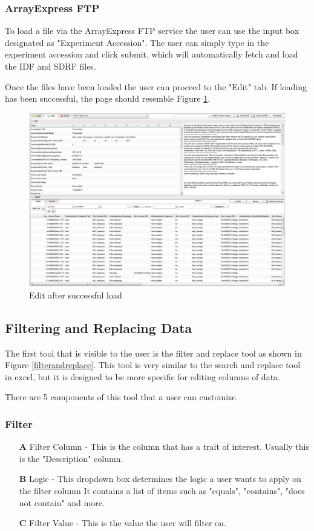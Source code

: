 \documentclass[a4paper]{article}
\begin{document}
\subsubsection{ArrayExpress FTP}
To load a file via the ArrayExpress FTP service the user can use the input box designated as "Experiment Accession". The user can simply type in the experiment accession and click submit, which will automatically fetch and load the IDF and SDRF files.

Once the files have been loaded the user can proceed to the "Edit" tab. If loading has been successful, the page should resemble Figure \ref{edittab}.

\begin{figure}[h!]
\caption{Edit after successful load}
\centering
\label{edittab}
\includegraphics[width=15cm]{images/Edit}
\end{figure}
\subsection{Filtering and Replacing Data}


The first tool that is visible to the user is the filter and replace tool as shown in Figure \ref{filterandreplace}. This tool is very similar to the search and replace tool in excel, but it is designed to be more specific for editing columns of data.


There are 5 components of this tool that a user can customize.
\subsubsection{Filter}

\begin{enumerate}
\item[\bf{A}] Filter Column - This is the column that has a trait of interest. Usually this is the "Description" column.
\item[\bf{B}] Logic - This dropdown box determines the logic a user wants to apply on the filter column It contains a list of items such as "equals", "contains", "does not contain" and more.
\item[\bf{C}] Filter Value - This is the value the user will filter on.
\end{enumerate}
\end{document}
